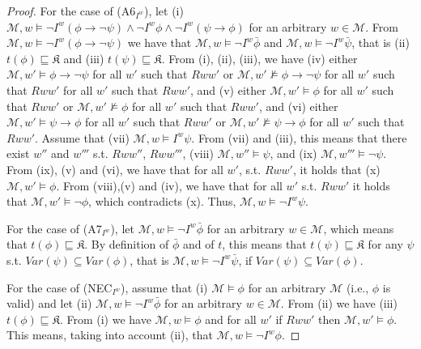 \documentclass{article}
\begin{document}
\begin{proof}
For the case of (A6$_{I^{w}}$), let (i) $\mathcal{M}, w \models \neg I^{w} (\phi \rightarrow \neg \psi) \wedge \neg I^{w} \phi \wedge \neg I^{w} (\psi \rightarrow \phi)$ for an arbitrary $w \in \mathcal{M}$. From  $\mathcal{M}, w \models \neg I^{w} (\phi \rightarrow \neg \psi)$ we have that $\mathcal{M}, w \models \neg I^{w} \bar{\phi}$ and $\mathcal{M}, w \models \neg I^{w} \bar{\psi}$, that is (ii) $t(\phi) \sqsubseteq \mathfrak{K}$ and (iii) $t(\psi) \sqsubseteq \mathfrak{K}$. From (i), (ii), (iii), we have (iv) either $\mathcal{M}, w' \models \phi \rightarrow \neg \psi$ for all $w'$ such that $Rww'$ or $\mathcal{M}, w' \not \models \phi \rightarrow \neg \psi$ for all $w'$ such that $Rww'$ for all $w'$ such that $Rww'$, and (v) either $\mathcal{M}, w' \models \phi$ for all $w'$ such that $Rww'$ or $\mathcal{M}, w' \not \models \phi$ for all $w'$ such that $Rww'$, and (vi) either $\mathcal{M}, w' \models \psi \rightarrow \phi$ for all $w'$ such that $Rww'$ or $\mathcal{M}, w' \not \models \psi \rightarrow \phi$ for all $w'$ such that $Rww'$. Assume that (vii) $\mathcal{M}, w \models I^{w} \psi$. From (vii) and (iii), this means that there exist $w''$ and $w'''$ s.t. $Rww''$, $Rww'''$, (viii) $\mathcal{M}, w'' \models \psi$, and (ix) $\mathcal{M}, w''' \models \neg \psi$. From (ix), (v) and (vi), we have that for all $w'$, s.t. $Rww'$, it holds that (x) $\mathcal{M}, w' \models \phi$. From (viii),(v) and (iv), we have that for all $w'$ s.t. $Rww'$ it holds that $\mathcal{M}, w' \models \neg \phi$, which contradicts (x). Thus, $\mathcal{M}, w \models \neg I^{w} \psi$.

For the case of (A7$_{I^{w}}$), let $\mathcal{M}, w \models \neg I^{w} \bar{\phi}$ for an arbitrary $w \in \mathcal{M}$, which means that $t(\phi) \sqsubseteq \mathfrak{K}$. By definition of $\bar{\phi}$ and of $t$, this means that $t(\psi) \sqsubseteq \mathfrak{K}$ for any $\psi$ s.t. $Var(\psi) \subseteq Var (\phi) $, that is $\mathcal{M}, w \models \neg I^{w} \bar{\psi}$, if $Var(\psi) \subseteq Var(\phi)$.

For the case of (NEC$_{I^{w}}$), assume that (i) $\mathcal{M} \models \phi$ for an arbitrary $\mathcal{M}$ (i.e., $\phi$ is valid) and let (ii) $\mathcal{M}, w \models \neg I^{w} \bar{\phi}$ for an arbitrary $w \in \mathcal{M}$. From (ii) we have (iii) $t(\phi) \sqsubseteq \mathfrak{K}$. From (i) we have $\mathcal{M}, w \models \phi$ and for all $w'$ if $Rww'$ then $\mathcal{M}, w' \models \phi$. This means, taking into account (ii), that $\mathcal{M}, w \models \neg I^{w} \phi$. 


\end{proof}
\end{document}
